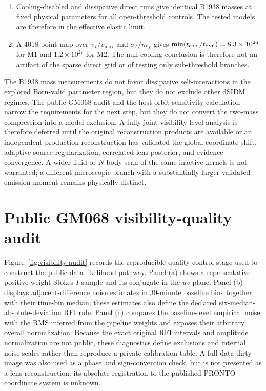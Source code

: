 \documentclass[12pt]{article}
\newcommand{\sigmavm}{\sigma_T/m_\chi}
\newcommand{\vstar}{v_\star}
\newcommand{\tcool}{t_{\rm cool}}
\newcommand{\tdyn}{t_{\rm dyn}}
\begin{document}
\begin{enumerate}
  $\mathrm{km\,s^{-1}}$ branches are radiatively open, but the shortest
  cooling time is $8.7\times10^{22}$ Gyr.
  \item Cooling-disabled and dissipative direct runs give identical B1938
  masses at fixed physical parameters for all open-threshold controls.  The
  tested models are therefore in the effective elastic limit.
  \item A 4018-point map over $\vstar/v_{\max}$ and $\sigmavm$ gives
  $\min(\tcool/\tdyn)=8.3\times10^{26}$ for M1 and $1.2\times10^{27}$ for M2.
  The null cooling conclusion is therefore not an artifact of the sparse
  direct grid or of testing only sub-threshold branches.
\end{enumerate}

The B1938 mass measurements do not favor dissipative self-interactions in the
explored Born-valid parameter region, but they do not exclude other dSIDM
regimes.  The public GM068 audit and the host-orbit sensitivity calculation
narrow the requirements for the next step, but they do not convert the
two-mass compression into a model exclusion.  A fully joint visibility-level
analysis is therefore deferred until the original reconstruction products are
available or an independent production reconstruction has validated the
global coordinate shift, adaptive source regularization, correlated lens
posterior, and evidence convergence.  A wider fluid or $N$-body scan of the
same inactive kernels is not warranted; a different microscopic branch with a
substantially larger validated emission moment remains physically distinct.

\appendix
\section{Public GM068 visibility-quality audit}
\label{app:visibility-audit}

Figure~\ref{fig:visibility-audit} records the reproducible quality-control
stage used to construct the public-data likelihood pathway.  Panel (a) shows a
representative positive-weight Stokes-$I$ sample and its conjugate in the
$uv$ plane.  Panel (b) displays adjacent-difference noise estimates in
30-minute baseline bins together with their time-bin median; these estimates
also define the declared six-median-absolute-deviation RFI rule.  Panel (c)
compares the baseline-level empirical noise with the RMS inferred from the
pipeline weights and exposes their arbitrary overall normalization.  Because
the exact original RFI intervals and amplitude normalization are not public,
these diagnostics define exclusions and internal noise scales rather than
reproduce a private calibration table.  A full-data dirty image was also used
as a phase and sign-convention check, but is not presented as a lens
reconstruction: its absolute registration to the published PRONTO coordinate
system is unknown.
\end{document}
